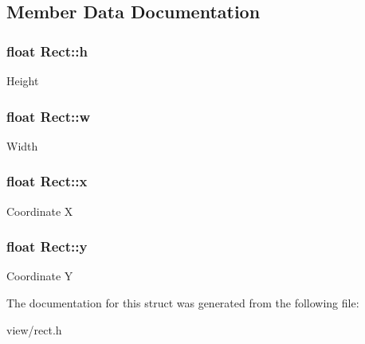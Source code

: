 \subsection{Member Data Documentation}
\hypertarget{struct_rect_aa10c9b8950c6b23a0b2bf0d39f2be904}{
\subsubsection[{h}]{\setlength{\rightskip}{0pt plus 5cm}float Rect\-::h}}\label{struct_rect_aa10c9b8950c6b23a0b2bf0d39f2be904}
Height \hypertarget{struct_rect_a049f7ee5e7eb0475229bf3ed9b3bad44}{
\subsubsection[{w}]{\setlength{\rightskip}{0pt plus 5cm}float Rect\-::w}}\label{struct_rect_a049f7ee5e7eb0475229bf3ed9b3bad44}
Width \hypertarget{struct_rect_a29bc9b88a8c5537620f05ac7069f48cc}{
\subsubsection[{x}]{\setlength{\rightskip}{0pt plus 5cm}float Rect\-::x}}\label{struct_rect_a29bc9b88a8c5537620f05ac7069f48cc}
Coordinate X \hypertarget{struct_rect_a4ea33d8210fa0b8b0d6ef3f7e06e6b27}{
\subsubsection[{y}]{\setlength{\rightskip}{0pt plus 5cm}float Rect\-::y}}\label{struct_rect_a4ea33d8210fa0b8b0d6ef3f7e06e6b27}
Coordinate Y 

The documentation for this struct was generated from the following file\-:\begin{DoxyCompactItemize}
\item 
view/rect.\-h\end{DoxyCompactItemize}

